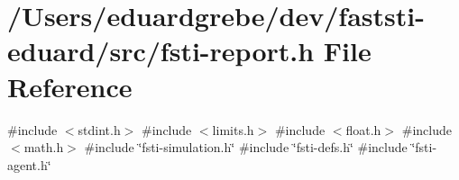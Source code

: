\hypertarget{fsti-report_8h}{}\section{/\+Users/eduardgrebe/dev/faststi-\/eduard/src/fsti-\/report.h File Reference}
\label{fsti-report_8h}
{\ttfamily \#include $<$stdint.\+h$>$}\newline
{\ttfamily \#include $<$limits.\+h$>$}\newline
{\ttfamily \#include $<$float.\+h$>$}\newline
{\ttfamily \#include $<$math.\+h$>$}\newline
{\ttfamily \#include \char`\"{}fsti-\/simulation.\+h\char`\"{}}\newline
{\ttfamily \#include \char`\"{}fsti-\/defs.\+h\char`\"{}}\newline
{\ttfamily \#include \char`\"{}fsti-\/agent.\+h\char`\"{}}\newline
